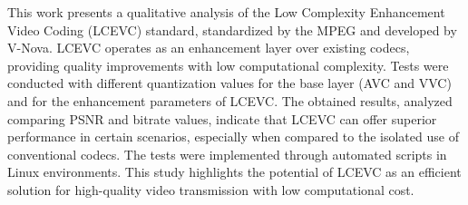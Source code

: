 This work presents a qualitative analysis of the Low Complexity Enhancement Video Coding 
(\acrshort{LCEVC}) standard, standardized by the \acrshort{MPEG} and developed by V-Nova. 
\acrshort{LCEVC} operates as an enhancement layer over existing codecs, providing quality 
improvements with low computational complexity. Tests were conducted with different 
quantization values for the base layer (\acrshort{AVC} and \acrshort{VVC}) and for the 
enhancement parameters of \acrshort{LCEVC}. The obtained results, analyzed comparing
\acrshort{PSNR} and bitrate values, indicate that \acrshort{LCEVC} can offer superior 
performance in certain scenarios, especially when compared to the isolated use of 
conventional codecs. The tests were implemented through automated scripts in Linux 
environments. This study highlights the potential of \acrshort{LCEVC} as an efficient 
solution for high-quality video transmission with low computational cost.
